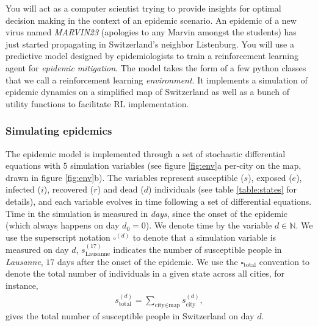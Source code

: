 \documentclass[10pt]{article}
\begin{document}
You will act as a computer scientist trying to provide insights for optimal decision making in the context of an epidemic scenario. 
An epidemic of a new virus named  \textit{MARVIN23} (apologies to any Marvin amongst the students) has just started
propagating in Switzerland's neighbor Listenburg. You will use a predictive model designed by epidemiologists to train
a reinforcement learning agent for \textit{epidemic mitigation}. The model takes the form of a few python classes that
we call a reinforcement learning \textit{environment}. It implements a simulation of epidemic dynamics on a simplified
map of Switzerland as well as a bunch of utility functions to facilitate RL implementation. \\

\subsubsection*{Simulating epidemics}

The epidemic model is implemented through a set of stochastic differential equations with 5 simulation variables (see figure \ref{fig:env}a per-city on the map, drawn in figure \ref{fig:env}b). The variables represent susceptible ($s$), exposed ($e$), infected ($i$), recovered ($r$) and dead ($d$) individuals (see table \ref{table:states} for details), and each variable evolves in time following a set of differential equations.
Time in the simulation is measured in \textit{days}, since the onset of the epidemic (which always happens on day $d_0=0$).
We denote time by the variable $d \in \mathbb{N}$. We use the superscript notation $\square^{(d)}$ to denote that a simulation variable is measured on day $d$, $s_\text{Lausanne}^{(17)}$ indicates the number of susceptible people in \textit{Lausanne}, $17$ days after the onset of the epidemic.
We use the $\square_\text{total}$ convention to denote the total number of individuals in a given state across all cities, for instance, 
\begin{align*}
  s_\text{total}^{(d)} = \sum_{\text{city} \in \text{map}} s_\text{city}^{(d)},
\end{align*}
gives the total number of susceptible people in Switzerland on day $d$.
\end{document}

